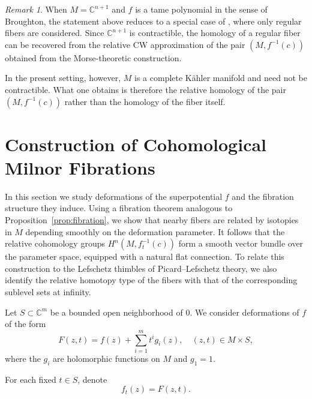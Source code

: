 \documentclass[11pt]{amsart}
\theoremstyle{plain}
\theoremstyle{definition}
\theoremstyle{remark}
\newtheorem{remark}[theorem]{Remark}
\numberwithin{equation}{section}
\begin{document}
\begin{remark}\label{rem:broughton}
    When $M = \mathbb{C}^{n+1}$ and $f$ is a tame polynomial in the sense of Broughton, the statement above reduces to a special case of \cite[Theorem 1.2]{Broughton1988}, where only regular fibers are considered.
    Since $\mathbb{C}^{n+1}$ is contractible, the homology of a regular fiber can be recovered from the relative CW approximation of the pair $(M, f^{-1}(c))$ obtained from the Morse-theoretic construction.

    In the present setting, however, $M$ is a complete K\"ahler manifold and need not be contractible.
    What one obtains is therefore the relative homology of the pair $(M, f^{-1}(c))$ rather than the homology of the fiber itself.
\end{remark}

\section{Construction of Cohomological Milnor Fibrations}\label{sec:construction}

In this section we study deformations of the superpotential $f$ and the fibration structure they induce.
Using a fibration theorem analogous to Proposition~\ref{prop:fibration}, we show that nearby fibers are related by isotopies in $M$ depending smoothly on the deformation parameter.
It follows that the relative cohomology groups $H^n(M, f_t^{-1}(c))$ form a smooth vector bundle over the parameter space, equipped with a natural flat connection.
To relate this construction to the Lefschetz thimbles of Picard--Lefschetz theory, we also identify the relative homotopy type of the fibers with that of the corresponding sublevel sets at infinity.

Let $S \subset \mathbb{C}^m$ be a bounded open neighborhood of $0$.
We consider deformations of $f$ of the form
\begin{equation}
    F(z,t) = f(z) + \sum_{i=1}^{m} t^i g_i(z), \quad (z,t) \in M \times S,
\end{equation}
where the $g_i$ are holomorphic functions on $M$ and $g_1 = 1$.

For each fixed $t \in S$, denote
\begin{equation}
    f_t(z) = F(z,t).
\end{equation}
\end{document}
